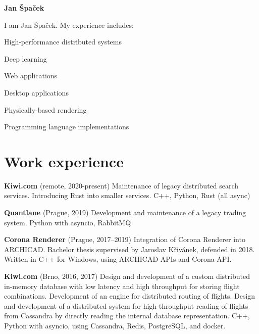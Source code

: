 \documentclass[11pt,a4paper]{article}
\begin{document}
\thispagestyle{empty}
\sffamily

{\bfseries\huge Jan Špaček}

\begin{multicols}{2}

I am Jan Špaček. My experience includes:
\begin{compactitem}
  \item High-performance distributed systems
  \item Deep learning
  \item Web applications
  \item Desktop applications
  \item Physically-based rendering
  \item Programming language implementations
\end{compactitem}

\section*{Work experience}

\textbf{Kiwi.com} (remote, 2020-present)
  \newline Maintenance of legacy distributed search services.
  \newline Introducing Rust into smaller services.
  \newline C++, Python, Rust (all async)

\textbf{Quantlane} (Prague, 2019)
  \newline Development and maintenance of a legacy trading system.
  \newline Python with asyncio, RabbitMQ

\textbf{Corona Renderer} (Prague, 2017–2019)
  \newline Integration of Corona Renderer into ARCHICAD.
  \newline Bachelor thesis supervised by Jaroslav Křivánek, defended in 2018.
  \newline Written in C++ for Windows, using ARCHICAD APIs and Corona API.

\textbf{Kiwi.com} (Brno, 2016, 2017)
  \newline Design and development of a custom distributed in-memory database
  with low latency and high throughput for storing flight combinations.
  \newline Development of an engine for distributed routing of flights.
  \newline Design and development of a distributed system for high-throughput
  reading of flights from Cassandra by directly reading the internal database
  representation.
  \newline C++, Python with asyncio, using Cassandra, Redis, PostgreSQL, and
  docker.


\end{multicols}
\end{document}
